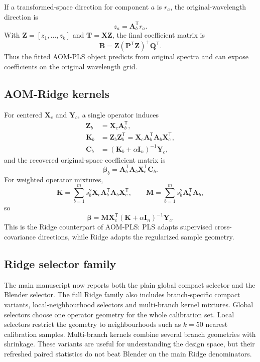 \documentclass[11pt,a4paper]{article}
\newcommand{\X}{\mathbf{X}}
\newcommand{\Y}{\mathbf{Y}}
\newcommand{\A}{\mathbf{A}}
\newcommand{\K}{\mathbf{K}}
\newcommand{\B}{\mathbf{B}}
\newcommand{\Z}{\mathbf{Z}}
\newcommand{\T}{\mathbf{T}}
\newcommand{\transpose}{^{\mathsf T}}
\begin{document}
If a transformed-space direction for component $a$ is $r_a$, the
original-wavelength direction is
\begin{equation}
  z_a=\A_b\transpose r_a .
\end{equation}
With $\Z=[z_1,\ldots,z_k]$ and $\T=\X\Z$, the final coefficient matrix is
\begin{equation}
  \B=\Z(\mathbf P\transpose\Z)^+\mathbf Q\transpose .
  \label{eq:sup_aompls_coef}
\end{equation}
Thus the fitted AOM-PLS object predicts from original spectra and can expose
coefficients on the original wavelength grid.

\subsection{AOM-Ridge kernels}

For centered $\X_c$ and $\Y_c$, a single operator induces
\begin{align}
  \mathbf Z_b &= \X_c\A_b\transpose,\\
  \K_b &= \mathbf Z_b\mathbf Z_b\transpose
       = \X_c\A_b\transpose\A_b\X_c\transpose,\\
  \mathbf C_b &= (\K_b+\alpha\mathbf I_n)^{-1}\Y_c,
\end{align}
and the recovered original-space coefficient matrix is
\begin{equation}
  \bm\beta_b=\A_b\transpose\A_b\X_c\transpose\mathbf C_b .
\end{equation}
For weighted operator mixtures,
\begin{equation}
  \K=\sum_{b=1}^{m}s_b^2\X_c\A_b\transpose\A_b\X_c\transpose,
  \qquad
  \mathbf M=\sum_{b=1}^{m}s_b^2\A_b\transpose\A_b,
\end{equation}
so
\begin{equation}
  \bm\beta=\mathbf M\X_c\transpose(\K+\alpha\mathbf I_n)^{-1}\Y_c.
\end{equation}
This is the Ridge counterpart of AOM-PLS: PLS adapts supervised
cross-covariance directions, while Ridge adapts the regularized sample
geometry.

\subsection{Ridge selector family}

The main manuscript now reports both the plain global compact selector and the
Blender selector.  The full Ridge family also includes branch-specific compact
variants, local-neighbourhood selectors and multi-branch kernel mixtures.
Global selectors choose one operator geometry for the whole calibration set.
Local selectors restrict the geometry to neighbourhoods such as $k=50$ nearest
calibration samples.  Multi-branch kernels combine several branch geometries
with shrinkage.  These variants are useful for understanding the design space,
but their refreshed paired statistics do not beat Blender on the main Ridge
denominators.
\end{document}
